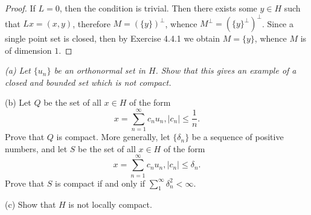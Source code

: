 \begin{proof}
If $L=0$, then the condition is trivial. Then there exists some $y\in H$ such that $Lx=(x,y)$, therefore $M=(\{y\})^\perp$, whence $M^\perp=(\{y\}^\perp)^\perp$. Since a single point set is closed, then by Exercise 4.4.1 we obtain $M=\{y\}$, whence $M$ is of dimension $1$.
\end{proof}
\begin{problem}\em
(a) Let $\{u_n\}$ be an orthonormal set in $H$. Show that this gives an example of a closed and bounded set which is not compact.\par
(b) Let $Q$ be the set of all $x\in H$ of the form 
$$
x=\sum_{n=1}^{\infty}{c_nu_n},\left| c_n \right|\le \frac{1}{n}.
$$
Prove that $Q$ is compact. More generally, let $\{\delta_n\}$ be a sequence of positive numbers, and let $S$ be the set of all $x\in H$ of the form 
$$
x=\sum_{n=1}^{\infty}{c_nu_n},\left| c_n \right|\le \delta _n.
$$
Prove that $S$ is compact if and only if $\sum_{1}^\infty\delta_n^2<\infty$.\par
(c) Show that $H$ is not locally compact.
\end{problem}
